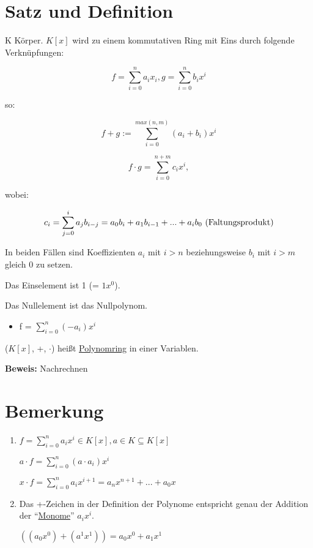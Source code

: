 \documentclass[a4paper, openany]{book}
\begin{document}
 \section{Satz und Definition}

 K Körper. $K[x]$ wird zu einem kommutativen Ring mit Eins durch folgende Verknüpfungen:

  \begin{equation}
   f = \sum_{i=0}^{n} a_ix_i, g = \sum_{i=0}^{n} b_ix^i
  \end{equation}
  
  so:

  \begin{equation}
    f+g := \sum_{i=0}^{max(n,m)} (a_i+b_i)x^i
  \end{equation}

  \begin{equation}
    f \cdot g = \sum_{i=0}^{n+m} c_ix^i, 
  \end{equation}

  wobei:

  \begin{equation}c_i = \sum_{j=0}^{i} a_jb_{i-j} = a_0b_i + a_1b_{i-1} + ... +a_ib_0 \textnormal{ (Faltungsprodukt)}
  \end{equation}

  In beiden Fällen sind Koeffizienten $a_i$ mit $i > n$ beziehungsweise $b_i$ mit $i > m$ gleich 0 zu setzen.

  Das Einselement ist 1 (= $1x^0$).

  Das Nullelement ist das Nullpolynom.

  \begin{itemize}
    \item f = $\sum_{i=0}^{n} (-a_i)x^i$
  \end{itemize}

  ($K[x]$, +, $\cdot$) heißt \underline{Polynomring} in einer Variablen.

  \par \medskip

  \textbf{Beweis:} Nachrechnen

  \section{Bemerkung}

  \begin{enumerate}[label=(\alph*)]
    \item $f = \sum_{i=0}^{n} a_ix^i \in K[x], a \in K \subseteq K[x]$

    $a \cdot f = \sum_{i=0}^{n} (a \cdot a_i)x^i$

    $x \cdot f = \sum_{i=0}^{n} a_ix^{i+1} = a_nx^{n+1} + ... + a_0x$

    \item Das +-Zeichen in der Definition der Polynome entspricht genau der Addition der ``\underline{Monome}'' $a_ix^i$.

    $((a_0x^0) + (a^1x^1)) = a_0x^0 + a_1x^1$
  \end{enumerate}
\end{document}

